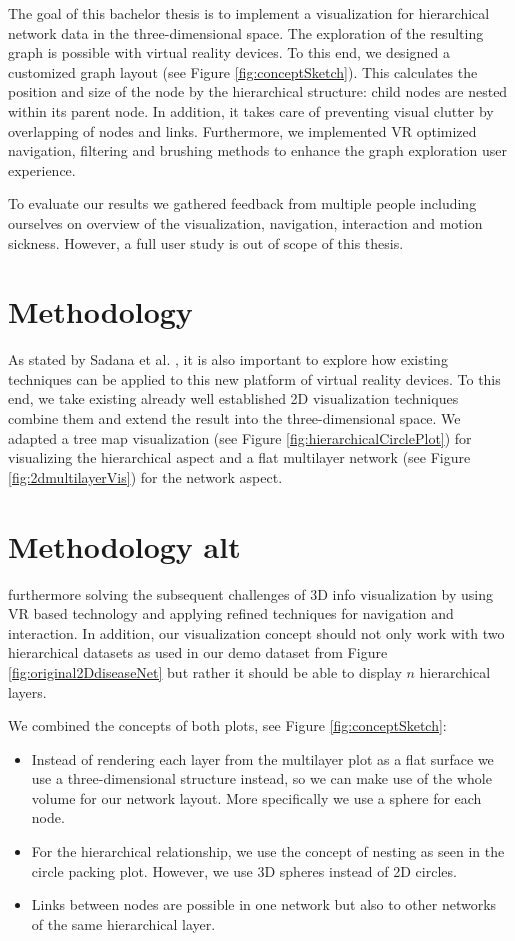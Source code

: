 The goal of this bachelor thesis is to implement a visualization for hierarchical network data in the three-dimensional space. The exploration of the resulting graph is possible with virtual reality devices. To this end, we designed a customized graph layout (see Figure \ref{fig:conceptSketch}).
This calculates the position and size of the node by the hierarchical structure: child nodes are nested within its parent node. In addition, it takes care of preventing visual clutter by overlapping of nodes and links. 
Furthermore, we implemented VR optimized navigation, filtering and brushing methods to enhance the graph exploration user experience.

To evaluate our results we gathered feedback from multiple people including ourselves on overview of the visualization, navigation, interaction and motion sickness. However, a full user study is out of scope of this thesis.   

\section{Methodology}
As stated by Sadana et al. \cite{sadana_redefining_2016}, it is also important to explore how existing techniques can be applied to this new platform of virtual reality devices. To this end, we take existing already well established 2D visualization techniques combine them and extend the result into the three-dimensional space. We adapted a tree map visualization (see Figure \ref{fig:hierarchicalCirclePlot}) for visualizing the hierarchical aspect and a flat multilayer network (see Figure \ref{fig:2dmultilayerVis}) for the network aspect.   

\section{Methodology alt}

furthermore solving the subsequent challenges of 3D info visualization by using VR based technology and applying refined techniques for navigation and interaction. 
In addition, our visualization concept should not only work with two hierarchical datasets as used in our demo dataset from Figure \ref{fig:original2DdiseaseNet} but rather it should be able to display $n$ hierarchical layers.

We combined the concepts of both plots, see Figure \ref{fig:conceptSketch}: 
\begin{itemize}
    \item Instead of rendering each layer from the multilayer plot as a flat surface we use a three-dimensional structure instead, so we can make use of the whole volume for our network layout. More specifically we use a sphere for each node.
    \item For the hierarchical relationship, we use the concept of nesting as seen in the circle packing plot. However, we use 3D spheres instead of 2D circles. 
    \item Links between nodes are possible in one network but also to other networks of the same hierarchical layer.   
\end{itemize}

